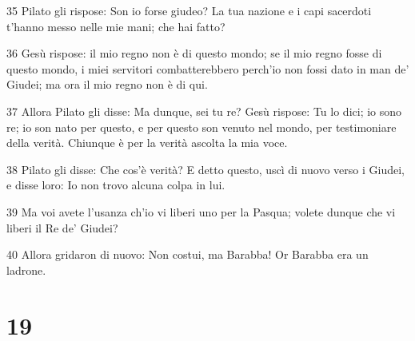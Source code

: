 \par 35 Pilato gli rispose: Son io forse giudeo? La tua nazione e i capi sacerdoti t'hanno messo nelle mie mani; che hai fatto?
\par 36 Gesù rispose: il mio regno non è di questo mondo; se il mio regno fosse di questo mondo, i miei servitori combatterebbero perch'io non fossi dato in man de' Giudei; ma ora il mio regno non è di qui.
\par 37 Allora Pilato gli disse: Ma dunque, sei tu re? Gesù rispose: Tu lo dici; io sono re; io son nato per questo, e per questo son venuto nel mondo, per testimoniare della verità. Chiunque è per la verità ascolta la mia voce.
\par 38 Pilato gli disse: Che cos'è verità? E detto questo, uscì di nuovo verso i Giudei, e disse loro: Io non trovo alcuna colpa in lui.
\par 39 Ma voi avete l'usanza ch'io vi liberi uno per la Pasqua; volete dunque che vi liberi il Re de' Giudei?
\par 40 Allora gridaron di nuovo: Non costui, ma Barabba! Or Barabba era un ladrone.

\chapter{19}

